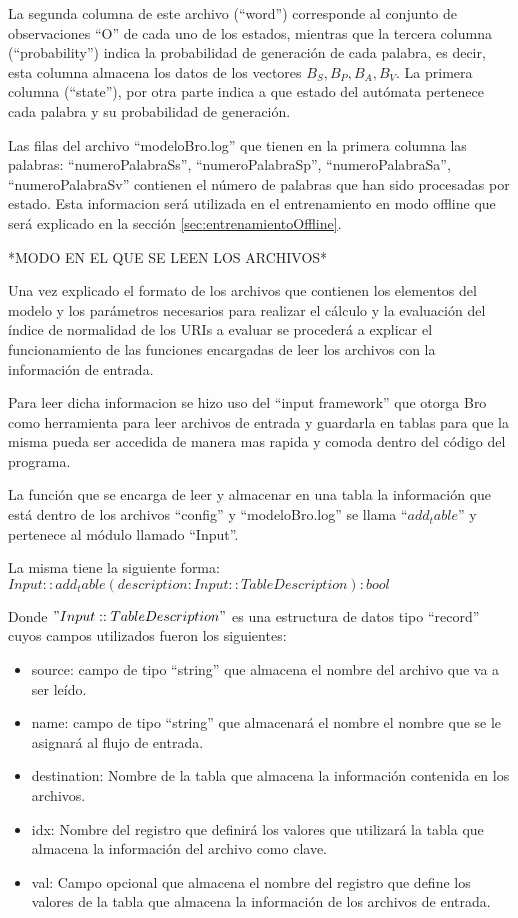 La segunda columna de este archivo (“word”) corresponde al conjunto de observaciones “O” de cada uno de los estados, mientras que la tercera columna (“probability”) indica la probabilidad de generación de cada palabra, es decir, esta columna almacena los datos de los vectores $B_{S}, B_{P}, B_{A}, B_{V}$. La primera columna (“state”), por otra parte indica a que estado del autómata pertenece cada palabra y su probabilidad de generación.

Las filas del archivo “modeloBro.log” que tienen en la primera columna las palabras:       “numeroPalabraSs”, “numeroPalabraSp”, “numeroPalabraSa”, “numeroPalabraSv” contienen el número de palabras que han sido procesadas por estado. Esta informacion será utilizada en el entrenamiento en modo offline que será explicado en la sección \ref{sec:entrenamientoOffline}.

*MODO EN EL QUE SE LEEN LOS ARCHIVOS*

Una vez explicado el formato de los archivos que contienen los elementos del modelo y los parámetros necesarios para realizar el cálculo y la evaluación del índice de normalidad de los URIs a evaluar se procederá a explicar el funcionamiento de las funciones encargadas de leer los archivos con la información de entrada.

Para leer dicha informacion se hizo uso del  “input framework” que otorga Bro como herramienta para leer archivos de entrada y guardarla en tablas para que la misma pueda ser accedida de manera mas rapida y comoda dentro del código del programa. 

La función que se encarga de leer y almacenar en una tabla la información que está dentro de los archivos “config” y “modeloBro.log”  se llama $“add_table”$ y pertenece al módulo llamado “Input”.


%
La misma tiene la siguiente forma: $Input::add_table(description: Input::TableDescription) : bool$ 

Donde $"Input::TableDescription"$ es una estructura de datos tipo “record” cuyos campos utilizados fueron los siguientes:

\begin{itemize}
\item source: campo de tipo “string” que almacena el nombre del archivo que va a ser leído.
\item name: campo de tipo “string” que almacenará el nombre el nombre que se le asignará al flujo de entrada.
\item destination: Nombre de la tabla que almacena la información contenida en los archivos.
\item idx: Nombre del registro que definirá los valores que utilizará la tabla que almacena la información del archivo como clave.
\item val: Campo opcional que almacena el nombre del registro que define los valores de la tabla que almacena la información de los archivos de entrada.
\end{itemize}

